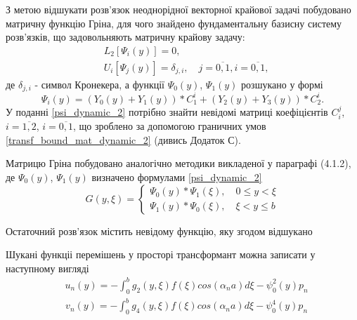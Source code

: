 З метою відшукати розв'язок неоднорідної векторної крайової задачі побудовано матричну функцію Гріна,
для чого знайдено фундаментальну базисну систему розв'язків, що задовольняють матричну крайову задачу:
\begin{align}\label{psi_probl_dynamic_2}
    &L_2\left[ \Psi_i(y) \right] = 0, \nonumber \\
    &U_i\left[ \Psi_j(y) \right] = \delta_{j,i}, \quad j= \overline{0, 1}, i= \overline{0, 1},
\end{align}
де $\delta_{j,i}$ - символ Кронекера, а функції  $\Psi_0(y)$, $\Psi_1(y)$ розшукано у формі
\begin{equation}\label{psi_dynamic_2}
    \Psi_i(y) = \left( Y_0(y) + Y_1(y) \right) * C_1^i + \left( Y_2(y) + Y_3(y) \right) * C_2^i.
\end{equation}
У поданні \eqref{psi_dynamic_2} потрібно знайти невідомі матриці коефіцієнтів $C_i^j$, $i=\overline{1, 2}$, $i=\overline{0,  1}$,
що зроблено за допомогою граничних умов \eqref{transf_bound_mat_dynamic_2} (дивись Додаток С).

Матрицю Гріна побудовано аналогічно методики викладеної у параграфі (4.1.2),
де $\Psi_0(y)$, $\Psi_1(y)$ визначено формулами \eqref{psi_dynamic_2}
\begin{equation}
    G(y,\xi) = 
    \begin{cases}
        \Psi_0(y) * \Psi_1(\xi), \quad 0 \le y < \xi \\
        \Psi_1(y) * \Psi_0(\xi), \quad \xi < y \le b
    \end{cases}
\end{equation}



Остаточний розв'язок містить невідому функцію, яку згодом відшукано

Шукані функціі перемішень у просторі трансформант можна записати у наступному вигляді
\begin{align}\label{transf_sol_u_dynamic_2}
    &u_n(y) = -\int_0^b g_2(y, \xi)f(\xi) cos(\alpha_n a) d\xi - \psi_0^2(y) p_n
\end{align}
\begin{align}\label{transf_sol_v_dynamic_2}
    &v_n(y) = -\int_0^b g_4(y, \xi)f(\xi) cos(\alpha_n a) d\xi - \psi_0^4(y) p_n
\end{align}


